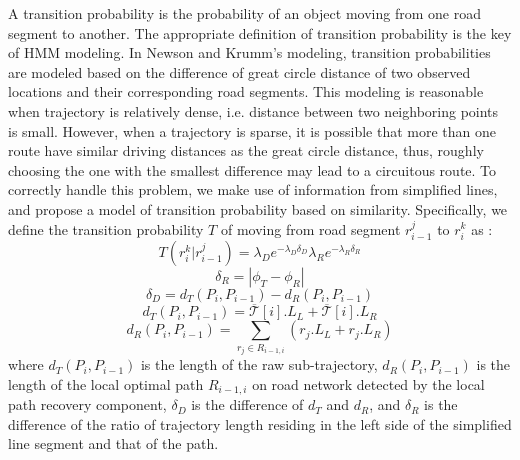 A transition probability is the probability of an object moving from
one road segment to another. The appropriate definition of transition
probability is the key of HMM modeling.
In Newson and Krumm's modeling, transition probabilities are modeled based on
the difference of great circle distance of two observed locations and their
corresponding road segments.
This modeling is reasonable when trajectory is relatively dense, i.e.
distance between two neighboring points is small. However, when a trajectory is sparse,
it is possible that more than one route have similar driving distances as the great
circle distance, thus, roughly choosing the one with the smallest difference may lead
to a circuitous route.
%
To correctly handle this problem, we make use of information from
simplified lines, and propose a model of transition probability based on
similarity.
%
Specifically, we define the transition probability $T$ of moving from road segment
$r_{i-1}^j$ to $r_i^k$ as :
\begin{equation}
  \label{equ:trans-prob}
  T(r_i^k| r_{i-1}^j) = \lambda_De^{-\lambda_D\delta_D}\lambda_Re^{-\lambda_R\delta_R}
\end{equation}
%
\begin{equation}
  \delta_R = |\phi_T -\phi_R|
\end{equation}
%
\begin{equation}
  \delta_D = d_T(P_i,P_{i-1}) - d_R(P_i,P_{i-1})
\end{equation}
%
\begin{equation}
  d_T(P_i,P_{i-1}) = \overline{\mathcal{T}}[i].L_L + \overline{\mathcal{T}}[i].L_R
\end{equation}
%
\begin{equation}
  d_R(P_i,P_{i-1}) =  \sum_{r_j \in R_{i-1, i}}{(r_j.L_L + r_j.L_R)}
\end{equation}
%
where $d_T(P_i,P_{i-1})$ is the length of the raw
sub-trajectory, $d_R(P_i,P_{i-1})$ is the length of the local optimal path $R_{i-1, i}$ on road network detected by the local path recovery component, $\delta_D $ is the
difference of $d_T$ and $d_R$, and $\delta_R $ is the difference of the
ratio of trajectory length residing in the left side of the
simplified line segment and that of the path.


